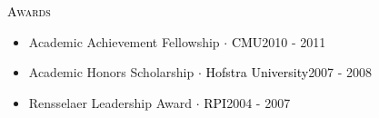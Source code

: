 \begin{minipage}{\firstWidth}
\large \textcolor{Black}{\textsc{Awards}} %
\end{minipage}
\begin{minipage}{\secondWidth}
\begin{itemize}
\item{Academic Achievement Fellowship \textcolor{Black}{$\cdot$ CMU}\hfill2010 - 2011 }
\item{Academic Honors Scholarship \textcolor{Black}{$\cdot$ Hofstra University}\hfill2007 - 2008}
\item{Rensselaer Leadership Award \textcolor{Black}{$\cdot$ RPI}\hfill2004 - 2007 }
\end{itemize}
\end{minipage}
